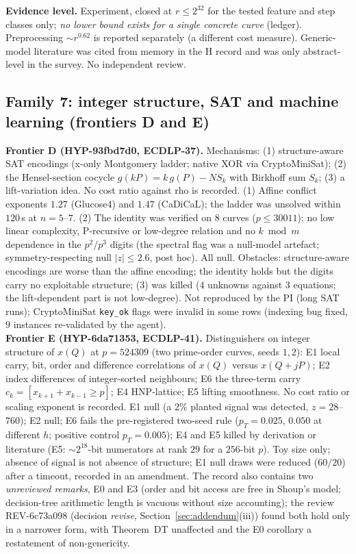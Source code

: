 \documentclass[11pt,a4paper]{article}
\theoremstyle{remark}
\begin{document}
\textbf{Evidence level.} Experiment, closed at $r\le2^{32}$ for the tested feature and step classes only; \emph{no lower bound exists for a single concrete curve} (ledger). Preprocessing $\sim r^{0.62}$ is reported separately (a different cost measure). Generic-model literature was cited from memory in the H record and was only abstract-level in the survey. No independent review.

\subsection{Family 7: integer structure, SAT and machine learning (frontiers D and E)}
\textbf{Frontier D (\mbox{HYP-93fbd7d0}, ECDLP-37).} Mechanisms: (1) structure-aware SAT encodings (x-only Montgomery ladder; native XOR via CryptoMiniSat); (2) the Hensel-section cocycle $g(kP)=k\,g(P)-NS_k$ with Birkhoff sum $S_k$; (3) a lift-variation idea. No cost ratio against rho is recorded. (1) Affine conflict exponents $1.27$ (Glucose4) and $1.47$ (CaDiCaL); the ladder was unsolved within $120$\,s at $n=5$--$7$. (2) The identity was verified on $8$ curves ($p\le30011$); no low linear complexity, P-recursive or low-degree relation and no $k\bmod m$ dependence in the $p^2/p^3$ digits (the spectral flag was a null-model artefact; symmetry-respecting null $|z|\le2.6$, post hoc). All null. Obstacles: structure-aware encodings are worse than the affine encoding; the identity holds but the digits carry no exploitable structure; (3) was killed ($4$ unknowns against $3$ equations; the lift-dependent part is not low-degree). Not reproduced by the PI (long SAT runs); CryptoMiniSat \texttt{key\_ok} flags were invalid in some rows (indexing bug fixed, $9$ instances re-validated by the agent).\\
\textbf{Frontier E (\mbox{HYP-6da71353}, ECDLP-41).} Distinguishers on integer structure of $x(Q)$ at $p=524309$ (two prime-order curves, seeds $1,2$): E1 local carry, bit, order and difference correlations of $x(Q)$ versus $x(Q+jP)$; E2 index differences of integer-sorted neighbours; E6 the three-term carry $c_k=[x_{k+1}+x_{k-1}\ge p]$; E4 HNP-lattice; E5 lifting smoothness. No cost ratio or scaling exponent is recorded. E1 null (a $2\%$ planted signal was detected, $z=28$--$760$); E2 null; E6 fails the pre-registered two-seed rule ($p_T=0.025$, $0.050$ at different $h$; positive control $p_T=0.005$); E4 and E5 killed by derivation or literature (E5: $\sim2^{18}$-bit numerators at rank $29$ for a $256$-bit $p$). Toy size only; absence of signal is not absence of structure; E1 null draws were reduced ($60/20$) after a timeout, recorded in an amendment. The record also contains two \emph{unreviewed remarks}, E0 and E3 (order and bit access are free in Shoup's model; decision-tree arithmetic length is vacuous without size accounting); the review \mbox{REV-6c73a098} (decision \emph{revise}, Section~\ref{sec:addendum}(iii)) found both hold only in a narrower form, with Theorem~DT unaffected and the E0 corollary a restatement of non-genericity.\\
\end{document}
